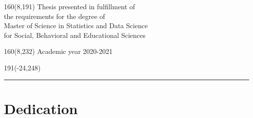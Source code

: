 \documentclass[12pt,a4paper,oneside]{book}
\begin{document}
%
\begin{textblock}{160}(8,191)
\textblockcolour{}
\vspace{-\parskip}
\flushright
Thesis presented in fulfillment of\\[4.5pt]
the requirements for the degree of\\[4.5pt]
Master of Science in Statistics and Data Science\\[4.5pt]
for Social, Behavioral and Educational Sciences
\end{textblock}
%
\begin{textblock}{160}(8,232)
\textblockcolour{}
\vspace{-\parskip}
\flushright
Academic year 2020-2021
\end{textblock}
%
\begin{textblock}{191}(-24,248)
{\color{blueline}\rule{550pt}{5.5pt}}
\end{textblock}
%
\vfill
\newpage
%
\rmfamily
\setcounter{page}{0}
\stackMath
%
\chapter*{Dedication}
\end{document}
